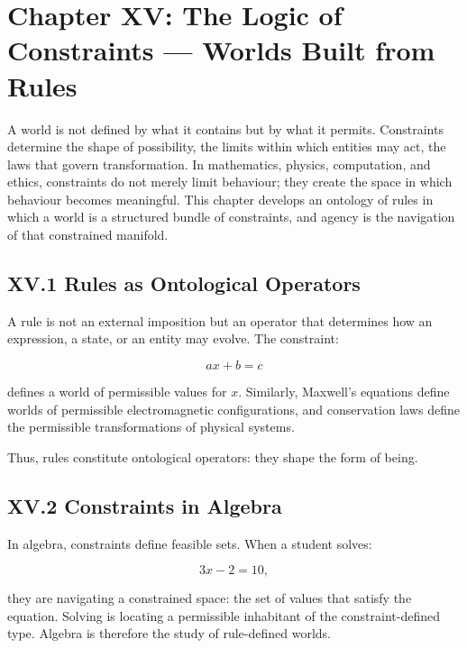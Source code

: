 \documentclass[11pt,letterpaper]{article}
\begin{document}
\newpage
\section{Chapter XV: The Logic of Constraints — Worlds Built from Rules}

A world is not defined by what it contains but by what it permits. Constraints determine the shape of possibility, the limits within which entities may act, the laws that govern transformation. In mathematics, physics, computation, and ethics, constraints do not merely limit behaviour; they create the space in which behaviour becomes meaningful. This chapter develops an ontology of rules in which a world is a structured bundle of constraints, and agency is the navigation of that constrained manifold.

\subsection{XV.1 Rules as Ontological Operators}

A rule is not an external imposition but an operator that determines how an expression, a state, or an entity may evolve. The constraint:

\[
ax + b = c
\]

defines a world of permissible values for \(x\). Similarly, Maxwell’s equations define worlds of permissible electromagnetic configurations, and conservation laws define the permissible transformations of physical systems.

Thus, rules constitute ontological operators: they shape the form of being.

\subsection{XV.2 Constraints in Algebra}

In algebra, constraints define feasible sets. When a student solves:

\[
3x - 2 = 10,
\]

they are navigating a constrained space: the set of values that satisfy the equation. Solving is locating a permissible inhabitant of the constraint-defined type. Algebra is therefore the study of rule-defined worlds.
\end{document}
